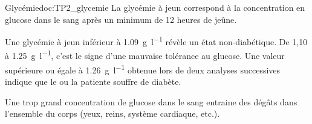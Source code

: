 \begin{doc}{Glycémie}{doc:TP2_glycemie}
  La glycémie à jeun correspond à la concentration en glucose dans le sang après un minimum de 12 heures de jeûne.

  Une glycémie à jeun inférieur à \qty{1,09}{\g\per\litre} révèle un état non-diabétique.
  De 1,10 à \qty{1,25}{\g\per\litre}, c'est le signe d'une mauvaise tolérance au glucose.
  Une valeur supérieure ou égale à \qty{1,26}{\g\per\litre} obtenue lors de deux analyses successives indique que le ou la patiente souffre de diabète.

  Une trop grand concentration de glucose dans le sang entraine des dégâts dans l'ensemble du corps (yeux, reins, système cardiaque, etc.).
\end{doc}





